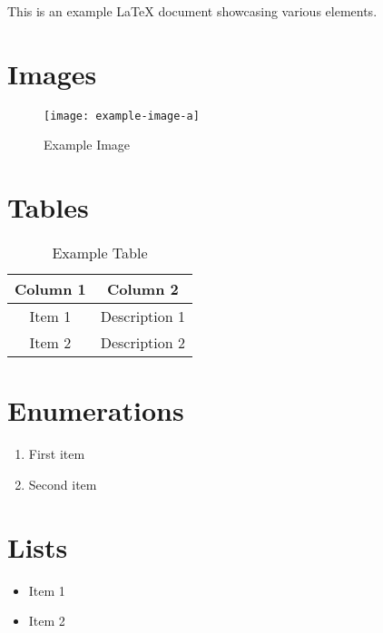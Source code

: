 \documentclass[10pt, a4paper]{article} %
\begin{document}
\restoregeometry %

\clearpage
\tableofcontents

\clearpage
\listoffigures

\clearpage
\listoftables

\clearpage
\lstlistoflistings

\maketitle

This is an example LaTeX document showcasing various elements.

\section{Images}
\begin{figure}[h]
	\centering
	\texttt{[image: example-image-a]}
	\caption{Example Image}
	\label{fig:example}
\end{figure}

\section{Tables}
\begin{table}[h]
	\centering
	\begin{tabular}{|c|c|}
		\hline
		Column 1 & Column 2 \\
		\hline
		Item 1 & Description 1 \\
		Item 2 & Description 2 \\
		\hline
	\end{tabular}
	\caption{Example Table}
	\label{tab:example}
\end{table}

\section{Enumerations}
\begin{enumerate}
	\item First item
	\item Second item
\end{enumerate}

\section{Lists}
\begin{itemize}
	\item Item 1
	\item Item 2
\end{itemize}
\end{document}
